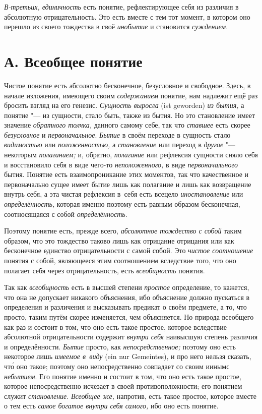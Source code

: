 {\em В-третьих, единичность} есть
понятие, рефлектирующее себя из различия в абсолютную отрицательность. Это
есть вместе с тем тот момент, в котором оно перешло из своего тождества в
своё {\em инобытие} и становится {\em суждением}.

\section[А. Всеобщее понятие]{А. Всеобщее понятие}

Чистое понятие есть абсолютно бесконечное, безусловное и свободное. Здесь,
в начале изложения, имеющего своим {\em содержанием} понятие, нам надлежит
ещё раз бросить взгляд на его генезис. {\em Сущность выросла} (ist geworden)
{\em из бытия,} а понятие "--- из сущности, стало быть, также из бытия.
Но это становление имеет значение {\em обратного толчка,} данного самому себе,
так что {\em ставшее} есть скорее {\em безусловное} и {\em первоначальное}.
{\em Бытие} в своём переходе в сущность стало {\em видимостью} или
{\em положенностью,} а {\em становление} или переход
в {\em другое} "--- некоторым {\em полаганием;} и, обратно, {\em полагание}
или рефлексия сущности сняло себя и восстановило себя в виде чего-то
{\em неположенного,} в виде {\em первоначального} бытия. Понятие есть
взаимопроникание этих моментов, так что качественное и первоначально сущее
имеет бытие лишь как полагание и лишь как возвращение внутрь себя, а эта
чистая рефлексия в~себя есть всецело {\em иностановление} или
{\em определённость,} которая именно поэтому есть равным образом
бесконечная, соотносящаяся с собой {\em определённость}.

Поэтому понятие есть, прежде всего, {\em абсолютное тождество с собой}
таким образом, что это тождество таково лишь как отрицание
отрицания или как бесконечное единство отрицательности с самой собой. Это
{\em чистое соотношение} понятия с собой, являющееся этим соотношением
вследствие того, что оно полагает себя через отрицательность, есть
{\em всеобщность} понятия.

Так как {\em всеобщность} есть в высшей степени {\em простое}
определение, то кажется, что она не допускает никакого
объяснения, ибо объяснение должно пускаться в определения и различения и
высказывать предикат о своём предмете, а то, что просто,
таким путём скорее изменяется, чем объясняется. Но природа
всеобщего как раз и состоит в том, что оно есть такое простое, которое
вследствие абсолютной отрицательности содержит {\em внутри себя}
наивысшую степень различия и определённости. {\em Бытие} просто, как
{\em непосредственное;} поэтому оно есть некоторое лишь {\em имеемое в~виду}
(ein nur Gemeintes), и про него нельзя сказать, чт\'{о} оно такое; поэтому
оно непосредственно совпадает со своим иинымс
{\em небытием}.
Его понятие именно и состоит в том, что оно есть такое
простое, которое непосредственно исчезает в своей
противоположности; его понятием служит {\em становление}. {\em Всеобщее же,}
напротив, есть такое простое, которое вместе о тем есть
{\em самое богатое внутри себя самого,} ибо оно есть понятие.

